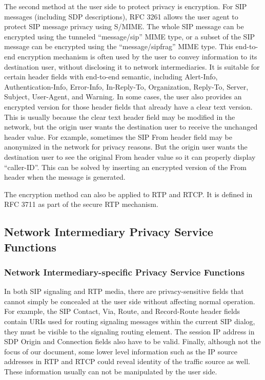 \documentclass[letterpaper,notitlepage,times,12pt]{article}
\begin{document}
The second method at the user side to protect privacy is encryption. For SIP messages (including SDP descriptions), RFC 3261 allows the user agent to protect SIP message privacy using S/MIME\cite{rfc3851}. The whole SIP message can be encrypted using the tunneled ``message/sip'' MIME type, or a subset of the SIP message can be encrypted using the ``message/sipfrag'' MIME type. This end-to-end encryption mechanism is often used by the user to convey information to its destination user, without disclosing it to network intermediaries. It is suitable for certain header fields with end-to-end semantic, including {\sf Alert-Info}, {\sf Authentication-Info}, {\sf Error-Info}, {\sf In-Reply-To}, {\sf Organization}, {\sf Reply-To}, {\sf Server}, {\sf Subject}, {\sf User-Agent}, and {\sf Warning}. In some cases, the user also provides an encrypted version for those header fields that already have a clear text version. This is usually because the clear text header field may be modified in the network, but the origin user wants the destination user to receive the unchanged header value. For example, sometimes the SIP {\sf From} header field may be anonymized in the network for privacy reasons. But the origin user wants the destination user to see the original {\sf From} header value so it can properly display ``caller-ID''. This can be solved by inserting an encrypted version of the {\sf From} header when the message is generated.

The encryption method can also be applied to RTP and RTCP. It is defined in RFC 3711 as part of the secure RTP mechanism. 







\subsection{Network Intermediary Privacy Service Functions} \label{sec:nps}

\subsubsection{Network Intermediary-specific Privacy Service Functions}  \label{sec:nispsf}

In both SIP signaling and RTP media, there are privacy-sensitive fields that cannot simply be concealed at the user side without affecting normal operation. For example, the SIP {\sf Contact}, {\sf Via}, {\sf Route}, and {\sf Record-Route} header fields contain URIs used for routing signaling messages within the current SIP dialog, they must be visible to the signaling routing element. The session IP address in SDP {\sf Origin} and {\sf Connection} fields also have to be valid. Finally, although not the focus of our document, some lower level information such as the IP source addresses in RTP and RTCP could reveal identity of the traffic source as well. These information usually can not be manipulated by the user side.
\end{document}
